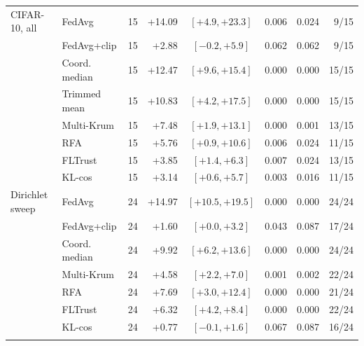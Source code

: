 \begin{table}[t]
\begin{tabular}{@{}llrrcrrr@{}}
\midrule
CIFAR-10, all & FedAvg & 15 & +14.09 & $[+4.9,+23.3]$ & 0.006 & 0.024 & 9/15\\
 & FedAvg+clip & 15 & +2.88 & $[-0.2,+5.9]$ & 0.062 & 0.062 & 9/15\\
 & Coord. median & 15 & +12.47 & $[+9.6,+15.4]$ & 0.000 & 0.000 & 15/15\\
 & Trimmed mean & 15 & +10.83 & $[+4.2,+17.5]$ & 0.000 & 0.000 & 15/15\\
 & Multi-Krum & 15 & +7.48 & $[+1.9,+13.1]$ & 0.000 & 0.001 & 13/15\\
 & RFA & 15 & +5.76 & $[+0.9,+10.6]$ & 0.006 & 0.024 & 11/15\\
 & FLTrust & 15 & +3.85 & $[+1.4,+6.3]$ & 0.007 & 0.024 & 13/15\\
 & KL-cos & 15 & +3.14 & $[+0.6,+5.7]$ & 0.003 & 0.016 & 11/15\\
\midrule
Dirichlet sweep & FedAvg & 24 & +14.97 & $[+10.5,+19.5]$ & 0.000 & 0.000 & 24/24\\
 & FedAvg+clip & 24 & +1.60 & $[+0.0,+3.2]$ & 0.043 & 0.087 & 17/24\\
 & Coord. median & 24 & +9.92 & $[+6.2,+13.6]$ & 0.000 & 0.000 & 24/24\\
 & Multi-Krum & 24 & +4.58 & $[+2.2,+7.0]$ & 0.001 & 0.002 & 22/24\\
 & RFA & 24 & +7.69 & $[+3.0,+12.4]$ & 0.000 & 0.000 & 21/24\\
 & FLTrust & 24 & +6.32 & $[+4.2,+8.4]$ & 0.000 & 0.000 & 22/24\\
 & KL-cos & 24 & +0.77 & $[-0.1,+1.6]$ & 0.067 & 0.087 & 16/24\\
\botrule
\end{tabular}
\end{table}
